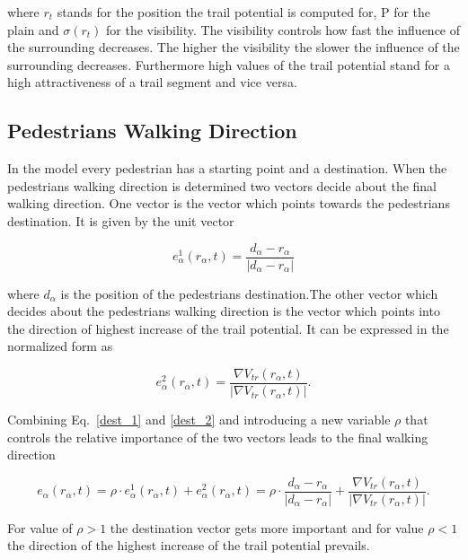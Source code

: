 where $r_t$ stands for the position the trail potential is computed for, P for the plain and $\sigma(r_t)$ for the visibility. The visibility controls how fast the influence of the surrounding decreases. The higher the visibility the slower the influence of the surrounding decreases. Furthermore high values of the trail potential stand for a high attractiveness of a trail segment and vice versa. 

\subsection{Pedestrians Walking Direction}
\label{pedestrians_direction}

In the model every pedestrian has a starting point and a destination. When the pedestrians walking direction is determined two vectors decide about the final walking direction. One vector is the vector which points towards the pedestrians destination. It is given by the unit vector

\begin{equation}
\label{dest_1}
e_{\alpha}^{1}(r_{\alpha},t)=\frac{d_{\alpha}-r_{\alpha}}{|d_{\alpha}-r_{\alpha}|}
\end{equation}

where $d_{\alpha}$ is the position of the pedestrians destination.The other vector which decides about the pedestrians walking direction is the vector which points into the direction of highest increase of the trail potential. It can be expressed in the normalized form as

\begin{equation}
\label{dest_2}
e_{\alpha}^{2}(r_{\alpha},t)=\frac{\nabla{V_{tr}(r_{\alpha},t)}}{|\nabla{V_{tr}(r_{\alpha},t)}|}.
\end{equation}

Combining Eq.\ \ref{dest_1} and \ref{dest_2} and introducing a new variable $\rho$ that controls the relative importance of the two vectors leads to the final walking direction

\begin{equation}
e_{\alpha}(r_{\alpha},t)=\rho \cdot e_{\alpha}^{1}(r_{\alpha},t)+e_{\alpha}^{2}(r_{\alpha},t)=\rho \cdot \frac{d_{\alpha}-r_{\alpha}}{|d_{\alpha}-r_{\alpha}|}+\frac{\nabla{V_{tr}(r_{\alpha},t)}}{|\nabla{V_{tr}(r_{\alpha},t)}|}.
\end{equation}

For value of $\rho>1$ the destination vector gets more important and for value $\rho<1$ the direction of the highest increase of the trail potential prevails.

